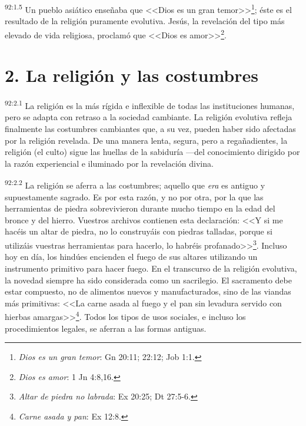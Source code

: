 \documentclass[twoside, 11pt]{book}
\begin{document}
\par
\textsuperscript{92:1.5} Un pueblo asiático enseñaba que <<Dios es un gran temor>>\footnote{\textit{Dios es un gran temor}: Gn 20:11; 22:12; Job 1:1.}; éste es el resultado de la religión puramente evolutiva. Jesús, la revelación del tipo más elevado de vida religiosa, proclamó que <<Dios es amor>>\footnote{\textit{Dios es amor}: 1 Jn 4:8,16.}.

\section*{2. La religión y las costumbres}
\par
\textsuperscript{92:2.1} La religión es la más rígida e inflexible de todas las instituciones humanas, pero se adapta con retraso a la sociedad cambiante. La religión evolutiva refleja finalmente las costumbres cambiantes que, a su vez, pueden haber sido afectadas por la religión revelada. De una manera lenta, segura, pero a regañadientes, la religión (el culto) sigue las huellas de la sabiduría ---del conocimiento dirigido por la razón experiencial e iluminado por la revelación divina.

\par
\textsuperscript{92:2.2} La religión se aferra a las costumbres; aquello que \textit{era} es antiguo y supuestamente sagrado. Es por esta razón, y no por otra, por la que las herramientas de piedra sobrevivieron durante mucho tiempo en la edad del bronce y del hierro. Vuestros archivos contienen esta declaración: <<Y si me hacéis un altar de piedra, no lo construyáis con piedras talladas, porque si utilizáis vuestras herramientas para hacerlo, lo habréis profanado>>\footnote{\textit{Altar de piedra no labrada}: Ex 20:25; Dt 27:5-6.}. Incluso hoy en día, los hindúes encienden el fuego de sus altares utilizando un instrumento primitivo para hacer fuego. En el transcurso de la religión evolutiva, la novedad siempre ha sido considerada como un sacrilegio. El sacramento debe estar compuesto, no de alimentos nuevos y manufacturados, sino de las viandas más primitivas: <<La carne asada al fuego y el pan sin levadura servido con hierbas amargas>>\footnote{\textit{Carne asada y pan}: Ex 12:8.}. Todos los tipos de usos sociales, e incluso los procedimientos legales, se aferran a las formas antiguas.
\end{document}
